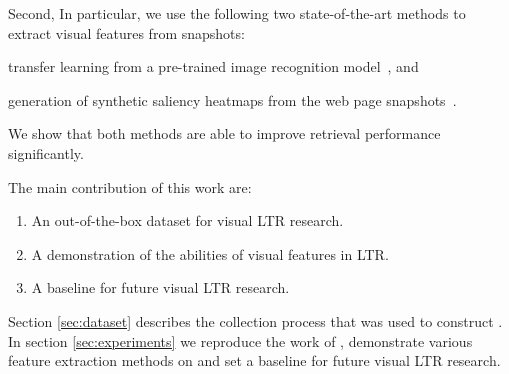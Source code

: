 Second, 
In particular, we use the following two state-of-the-art methods to extract visual features from snapshots:
\begin{inparaenum}[(i)]
\item transfer learning from a pre-trained image recognition model~\cite{donahue2014decaf,simonyan2014very}, and
\item generation of synthetic saliency heatmaps from the web page snapshots~\cite{shen2014webpage,shan2017two}.
\end{inparaenum}
We show that both methods are able to improve retrieval performance significantly.

The main contribution of this work are:
\begin{enumerate}  
\item An out-of-the-box dataset for visual \ac{LTR} research.
\item A demonstration of the abilities of visual features in \ac{LTR}.
\item A baseline for future visual \ac{LTR} research.
\end{enumerate}

Section \ref{sec:dataset} describes the collection process that was used to construct \datasetname. In section \ref{sec:experiments} we reproduce the work of \citet{fan2017learning}, demonstrate various feature extraction methods on \datasetname and set a baseline for future visual \ac{LTR} research.  